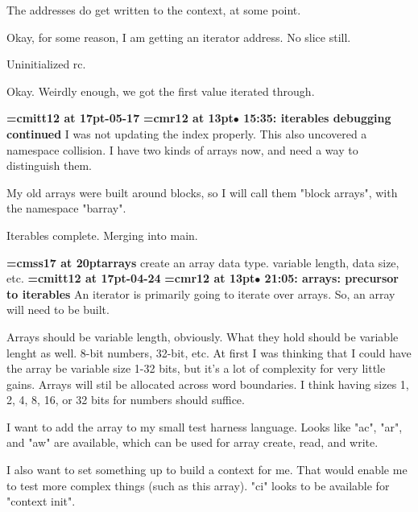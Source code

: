 The addresses do get written to the context, at some point.
\par

Okay, for some reason, I am getting an iterator address. No slice still.
\par

Uninitialized rc.
\par

Okay. Weirdly enough, we got the first value iterated through.
\par

{\medskip\noindent\bf\font\titlefont=cmitt12 at 17pt-05-17}\medskip
{\smallskip\noindent\bf\font\titlefont=cmr12 at 13pt\titlefont $\bullet$ 15:35: iterables debugging continued}\smallskip
I was not updating the index properly. This also uncovered a namespace collision. I have two kinds of arrays now, and need a way to distinguish them.
\par

My old arrays were built around blocks, so I will call them "block arrays", with the namespace "barray".
\par

Iterables complete. Merging into main.
\par

{\medskip\noindent\bf\font\titlefont=cmss17 at 20pt\titlefont arrays}\medskip
create an array data type. variable length, data size, etc.
{\medskip\noindent\bf\font\titlefont=cmitt12 at 17pt-04-24}\medskip
{\smallskip\noindent\bf\font\titlefont=cmr12 at 13pt\titlefont $\bullet$ 21:05: arrays: precursor to iterables}\smallskip
An iterator is primarily going to iterate over arrays. So, an array will need to be built.
\par

Arrays should be variable length, obviously. What they hold should be variable lenght as well. 8-bit numbers, 32-bit, etc. At first I was thinking that I could have the array be variable size 1-32 bits, but it's a lot of complexity for very little gains. Arrays will stil be allocated across word boundaries. I think having sizes 1, 2, 4, 8, 16, or 32 bits for numbers should suffice.
\par

I want to add the array to my small test harness language. Looks like "ac", "ar", and "aw" are available, which can be used for array create, read, and write.
\par

I also want to set something up to build a context for me. That would enable me to test more complex things (such as this array). "ci" looks to be available for "context init".
\par

